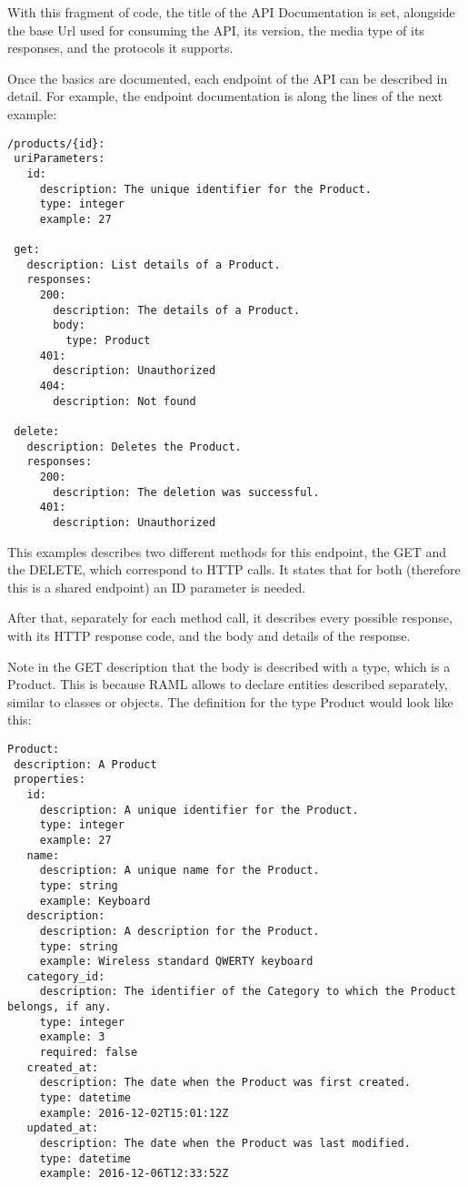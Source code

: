 With this fragment of code, the title of the API Documentation is set, alongside the base Url used for consuming the API, its version, the media type of its responses, and the protocols it supports.

Once the basics are documented, each endpoint of the API can be described in detail. For example, the  endpoint documentation is along the lines of the next example:

\begin{verbatim}
/products/{id}:
 uriParameters:
   id:
     description: The unique identifier for the Product.
     type: integer
     example: 27

 get:
   description: List details of a Product.
   responses:
     200:
       description: The details of a Product.
       body:
         type: Product
     401:
       description: Unauthorized
     404:
       description: Not found

 delete:
   description: Deletes the Product.
   responses:
     200:
       description: The deletion was successful.
     401:
       description: Unauthorized
\end{verbatim}

This examples describes two different methods for this endpoint, the GET and the DELETE, which correspond to HTTP calls. It states that for both (therefore this is a shared endpoint) an ID parameter is needed.

After that, separately for each method call, it describes every possible response, with its HTTP response code, and the body and details of the response.

Note in the GET description that the body is described with a type, which is a Product. This is because RAML allows to declare entities described separately, similar to classes or objects. The definition for the type Product would look like this:

\begin{verbatim}
Product:
 description: A Product
 properties:
   id:
     description: A unique identifier for the Product.
     type: integer
     example: 27
   name:
     description: A unique name for the Product.
     type: string
     example: Keyboard
   description:
     description: A description for the Product.
     type: string
     example: Wireless standard QWERTY keyboard
   category_id:
     description: The identifier of the Category to which the Product belongs, if any.
     type: integer
     example: 3
     required: false
   created_at:
     description: The date when the Product was first created.
     type: datetime
     example: 2016-12-02T15:01:12Z
   updated_at:
     description: The date when the Product was last modified.
     type: datetime
     example: 2016-12-06T12:33:52Z
\end{verbatim}


